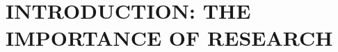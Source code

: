 %
%
%


\pagestyle{plain} %
\setcounter{page}{1}

\chapter{\uppercase {Introduction: The Importance of Research}}

